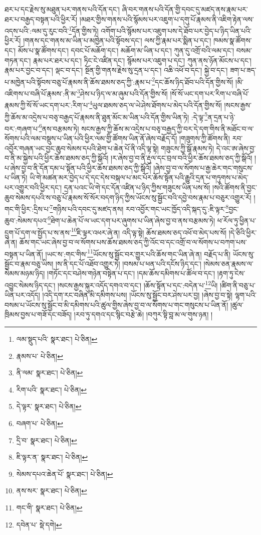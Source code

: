 ཐར་པ་དང་རྗེས་སུ་མཐུན་པར་གནས་པའི་དོན་དང་། ཞི་བར་གནས་པའི་དོན་གྱི་དབང་དུ་མཛད་ནས་རྣམ་པར་ཐར་པ་བརྒྱད་བསྟན་པའི་ཕྱིར་རོ། །མཐར་གྱིས་གནས་པའི་སྙོམས་པར་འཇུག་པ་དགུ་པོ་རྣམས་ནི་འཇིག་རྟེན་ལས་འདས་པའི་:ལམ་དུ་རུང་བའི་\footnote{ལམ་སྡུད་པའི་  སྣར་ཐང་།  པེ་ཅིན། }དོན་གྱིས་ཏེ། འགོག་པའི་སྙོམས་པར་འཇུག་པས་དེ་ཐོབ་པར་བྱེད་པ་ཉིད་ཡིན་པའི་ཕྱིར་རོ། །གནས་དང་གནས་མ་ཡིན་པ་མཁྱེན་པའི་སྟོབས་དང་། ལས་ཀྱི་རྣམ་པར་སྨིན་པ་དང་། ཁམས་སྣ་ཚོགས་དང་། མོས་པ་སྣ་ཚོགས་དང་། དབང་པོ་མཆོག་དང་། མཆོག་མ་ཡིན་པ་དང་། ཀུན་དུ་འགྲོ་བའི་ལམ་དང་། བསམ་གཏན་དང་། རྣམ་པར་ཐར་པ་དང་། ཏིང་ངེ་འཛིན་དང་། སྙོམས་པར་འཇུག་པ་དང་། ཀུན་ནས་ཉོན་མོངས་པ་དང་། རྣམ་པར་བྱང་བ་དང་། ལྡང་བ་དང་། སྔོན་གྱི་གནས་རྗེས་སུ་དྲན་པ་དང་། འཆི་འཕོ་བ་དང་། སྐྱེ་བ་དང་། ཟག་པ་ཟད་པ་མཁྱེན་པའི་སྟོབས་བཅུ་པོ་རྣམས་ནི་ཆོས་ཐམས་ཅད་ཀྱི་:རྣམ་པ་\footnote{རྣམས་པ་  པེ་ཅིན། }དང་ཆོས་ཉིད་ཐོབ་པའི་དོན་གྱིས་སོ། །མི་འཇིགས་པ་བཞི་པོ་རྣམས་:ནི་མ་\footnote{ནི་ལམ་  སྣར་ཐང་།  པེ་ཅིན། }ཤེས་པ་ཉིད་ལ་མ་ཞུམ་པའི་དོན་གྱིས་སོ། །སོ་སོ་ཡང་དག་པར་རིག་པ་བཞི་པོ་རྣམས་ཀྱི་སོ་སོ་ཡང་དག་པར་:རིག་པ་\footnote{རིག་པའི་  སྣར་ཐང་།  པེ་ཅིན། }ཡུལ་ཐམས་ཅད་ལ་ཡེ་ཤེས་ཐོགས་པ་མེད་པའི་དོན་གྱིས་སོ། །སངས་རྒྱས་ཀྱི་ཆོས་མ་འདྲེས་པ་བཅྭ་བརྒྱད་པོ་རྣམས་ནི་ཐུན་མོང་མ་ཡིན་པའི་དོན་གྱིས་ཡིན་ཏེ། :དེ་ལྟ་\footnote{དེ་ལྟར་  སྣར་ཐང་།  པེ་ཅིན། }ན་དྲན་པ་ཉེ་བར་:གཞག་པ་\footnote{བཞག་པ་  པེ་ཅིན། }ནས་བརྩམས་ཏེ། སངས་རྒྱས་ཀྱི་ཆོས་མ་འདྲེས་པ་བཅྭ་བརྒྱད་ཀྱི་བར་དེ་དག་གིས་ནི་མཐོང་བ་ལ་སོགས་པའི་ལམ་བསྡུས་པ་ཡིན་པའི་ཕྱིར་ལམ་གྱི་ཚོགས་ཡིན་ནོ་ཞེས་བརྗོད་དོ། །གཟུགས་ཀྱི་ཚོགས་ནི། རབ་འབྱོར་གཞན་ཡང་བྱང་ཆུབ་སེམས་དཔའི་ཐེག་པ་ཆེན་པོ་ནི་འདི་ལྟ་སྟེ། གཟུངས་ཀྱི་སྒོ་རྣམས་ཏེ། དེ་འང་ཨ་ཞེས་བྱ་བ་ནི་མ་སྐྱེས་པའི་ཕྱིར་ཆོས་ཐམས་ཅད་ཀྱི་སྒོའོ། །ར་ཞེས་བྱ་བ་ནི་རྡུལ་དང་བྲལ་བའི་ཕྱིར་ཆོས་ཐམས་ཅད་ཀྱི་སྒོའོ། །པ་ཞེས་བྱ་བ་ནི་དོན་དམ་པ་སྟོན་པའི་ཕྱིར་ཆོས་ཐམས་ཅད་ཀྱི་སྒོའོ། །ཞེས་བྱ་བ་ལ་སོགས་པ་རྒྱ་ཆེར་གང་གསུངས་པ་ཡིན་ཏེ། ཡི་གེ་མཚན་མར་བྱེད་པ་དེ་དང་དེས་བསྐལ་པ་མང་པོར་ཆོས་སྟོན་པའི་རྒྱུའི་དྲན་པ་གཏུགས་པ་མེད་པར་འགྱུར་བའི་ཕྱིར་དང་། དྲན་པའང་ཡི་གེ་དང་དོན་འཛིན་པ་ཉིད་ཀྱིས་གཟུངས་ཡིན་པས་སོ། །སའི་ཚོགས་ནི་བྱང་ཆུབ་སེམས་དཔའི་ས་བཅུ་པོ་རྣམས་སོ་སོར་བདག་ཉིད་ཀྱིས་ཡོངས་སུ་སྦྱོང་བའི་དབྱེ་བས་རྣམ་པ་བཅུར་འགྱུར་རོ། །གང་གི་ཕྱིར་:དྲིས་པ་\footnote{དྲི་བ་  སྣར་ཐང་།  པེ་ཅིན། }གཉིས་པའི་དབང་དུ་མཛད་ནས། རབ་འབྱོར་གང་ཡང་ཁྱོད་འདི་སྐད་དུ་:ཇི་ལྟར་\footnote{ཇི་ལྟར་ན་  སྣར་ཐང་།  པེ་ཅིན། }བྱང་ཆུབ་:སེམས་དཔའ་\footnote{སེམས་དཔའ་ཆེན་པོ་  སྣར་ཐང་།  པེ་ཅིན། }ཐེག་པ་ཆེན་པོ་ལ་ཡང་དག་པར་ཞུགས་པ་ཡིན་ཞེས་བྱ་བ་ནས་བརྩམས་ཏེ། ཕ་རོལ་ཏུ་ཕྱིན་པ་དྲུག་པོ་དག་ལ་སྤྱོད་པ་ས་ནས་\footnote{ནས་སར་  སྣར་ཐང་།  པེ་ཅིན། }ཇི་ལྟར་འཕར་ཞེ་ན། འདི་ལྟ་སྟེ། ཆོས་ཐམས་ཅད་འཕོ་བ་མེད་པས་སོ། །དེ་ཅིའི་ཕྱིར་ཞེ་ན། ཆོས་གང་ཡང་ཞེས་བྱ་བ་ལ་སོགས་པས་ཆོས་ཐམས་ཅད་ཀྱི་འོང་བ་དང་འགྲོ་བ་ལ་སོགས་པ་བཀག་པས་བསྟན་པ་ཡིན་ནོ། །ཡང་ས་:གང་གིས་\footnote{གང་གི་  སྣར་ཐང་།  པེ་ཅིན། }ཡོངས་སུ་སྦྱོང་བར་གྱུར་པའི་ཆོས་གང་ཡིན་ཞེ་ན། བརྗོད་པ་ནི། ཡོངས་སུ་སྦྱོང་བ་རྣམ་བཅུ་ཡིས། །ས་ནི་དང་པོ་འཐོབ་འགྱུར་ཏེ། །བསམ་པ་ཕན་པའི་དངོས་ཉིད་དང་། །སེམས་ཅན་རྣམས་ལ་སེམས་མཉམ་ཉིད། །གཏོང་དང་བཤེས་གཉེན་བསྟེན་པ་དང་། །དམ་ཆོས་དམིགས་པ་ཚོལ་བ་དང་། །རྟག་ཏུ་ངེས་འབྱུང་སེམས་ཉིད་དང་། །སངས་རྒྱས་སྐུར་འདོད་དགའ་བ་དང་། །ཆོས་སྟོན་པ་དང་:བདེན་པ་\footnote{དབེན་པ་  སྡེ་དགེ། }ཡི། །ཚིག་ནི་བཅུ་པ་ཡིན་པར་འདོད། །འདི་དག་རང་བཞིན་མི་དམིགས་པས། །ཡོངས་སུ་སྦྱོང་བར་ཤེས་པར་བྱ། །ཞེས་བྱ་བ་སྟེ། ལྷག་པའི་བསམ་པ་ཡོངས་སུ་སྦྱོང་བ་མི་དམིགས་པའི་ཚུལ་གྱིས་ཞེས་བྱ་བ་ལ་སོགས་པ་གང་གསུངས་པ་ཡིན་ནོ། །ཚུལ་ཁྲིམས་བྱས་པ་གཟོ་དང་བཟོད། །རབ་ཏུ་དགའ་དང་སྙིང་བརྩེ་ཆེ། །བཀུར་སྟི་བླ་མ་ལ་གུས་ཉན། །
